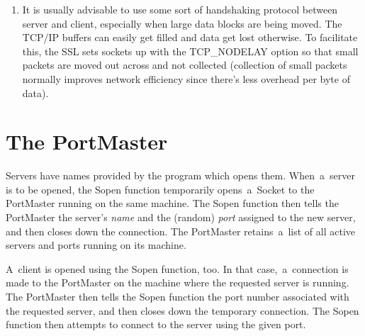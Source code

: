 \documentclass[12pt]{article}
\def\SSL{{\small SSL}}
\def\TCP{{\small TCP/IP }}
\newtheorem{example}{Example}[section]
\begin{document}
\begin{enumerate}
    The \verb`openClient`() function polls once~a~second in attempting to
    open~a~client Socket.  Once it succeeds,~a~ClientList data structure
    is allocated, double-linked, and~a~pointer to it returned.  In addition,
    the new client Socket is added to the Smask.

   \begin{example} Client Closing Function               \\ \label{client-closing}
    \begin{verbatim}
         void closeClient(ClientList *clist)
         {
         if(clist) {
             Smaskunset(clist->skt);
             Sclose(clist->skt);
             clist->skt= NULL;
             }
         }
    \end{verbatim}
   \end{example}

   The \verb`closeClient`() function removes the client Socket from the Smask
   system, closes the Socket, and then sets the skt pointer to NULL to guarantee
   that the now dead socket won't be inadvertently re-used somehow.

  \item It is usually advisable to use some sort of handshaking protocol between
   server and client, especially when large data blocks are being moved.  The {\TCP}    buffers can easily get filled and data get lost otherwise.  To facilitate this,
   the {\SSL} sets sockets up with the {\small TCP\_NODELAY} option so that small
   packets are moved out across and not collected (collection of small packets
   normally improves network efficiency since there's less overhead per byte of data).

\end{enumerate}

\newpage
\section{The PortMaster}

Servers have names provided by the program which opens them.  When~a~server is
to be opened, the Sopen function temporarily opens~a~Socket to the PortMaster
running on the same machine.  The Sopen function then tells the PortMaster the
server's {\em name} and the (random) {\em port} assigned to the new server, and
then closes down the connection.  The PortMaster retains~a~list of all active
servers and ports running on its machine.

A~client is opened using the Sopen function, too.  In that case,~a~connection
is made to the PortMaster on the machine where the requested server is
running.  The PortMaster then tells the Sopen function the port number
associated with the requested server, and then closes down the temporary
connection.  The Sopen function then attempts to connect to the server using
the given port.
\end{document}
